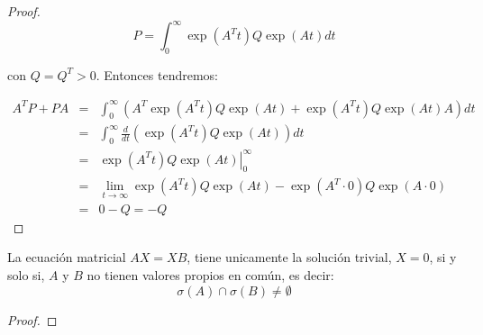 \begin{proof}
        \begin{equation*}
            P = \int_0^{\infty} \exp{(A^Tt)} Q \exp(At) dt
        \end{equation*}

        con $Q = Q^T > 0$. Entonces tendremos:

        \begin{eqnarray*}
            A^T P + P A & = & \int_0^{\infty} \left( A^T \exp{(A^T t)} Q \exp{(At)} + \exp{(A^T t)} Q \exp{(At)} A \right) dt \\
            & = & \int_0^{\infty} \frac{d}{dt} \left( \exp{(A^T t)} Q \exp{(At)} \right) dt \\
            & = & \left. \exp{(A^T t)} Q \exp{(At)} \right|_0^{\infty} \\
            & = & \lim_{t \to \infty} \exp{(A^T t)} Q \exp{(At)} - \exp{(A^T \cdot 0)} Q \exp{(A \cdot 0)} \\
            & = & 0 - Q = - Q
        \end{eqnarray*}
    \end{proof}

    \begin{lema}
        La ecuación matricial $A X = X B$, tiene unicamente la solución trivial, $X=0$, si y solo si, $A$ y $B$ no tienen valores propios en común, es decir:
        \begin{equation*}
            \sigma(A) \cap \sigma(B) \ne \emptyset
        \end{equation*}
    \end{lema}

    \begin{proof}
    \end{proof}
